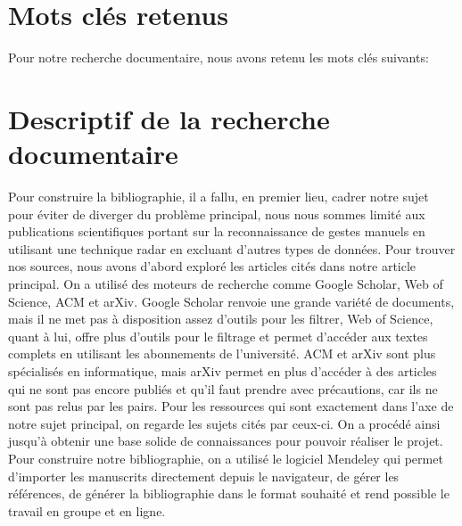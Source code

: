 \documentclass[12pt]{article}
\begin{document}
\section{Mots clés retenus}
Pour notre recherche documentaire, nous avons retenu les mots clés suivants:
\begin{center}
   \begin{figure}[!h]
    \label{img:dsr0}
\end{figure} 
\end{center}

\newpage
\section{Descriptif de la recherche documentaire}
Pour construire la bibliographie, il a fallu, en premier lieu, cadrer notre sujet pour éviter de diverger du problème principal, nous nous sommes limité aux publications scientifiques portant sur la reconnaissance de gestes manuels en utilisant une technique radar en excluant d'autres types de données. Pour trouver nos sources, nous avons d’abord exploré les articles cités dans notre article principal. On a utilisé des moteurs de recherche comme Google Scholar, Web of Science, ACM et arXiv. Google Scholar renvoie une grande variété de documents, mais il ne met pas à disposition assez d’outils pour les filtrer, Web of Science, quant à lui, offre plus d'outils pour le filtrage et permet d'accéder aux textes complets en utilisant les abonnements de l'université. ACM et arXiv sont plus spécialisés en informatique, mais arXiv permet en plus d'accéder à des articles qui ne sont pas encore publiés et qu'il faut prendre avec précautions, car ils ne sont pas relus par les pairs. Pour les ressources qui sont exactement dans l'axe de notre sujet principal, on regarde les sujets cités par ceux-ci. On a procédé ainsi jusqu’à obtenir une base solide de connaissances pour pouvoir réaliser le projet. Pour construire notre bibliographie, on a utilisé le logiciel Mendeley qui permet d'importer les manuscrits directement depuis le navigateur, de gérer les références, de générer la bibliographie dans le format souhaité et rend possible le travail en groupe et en ligne.
\end{document}

